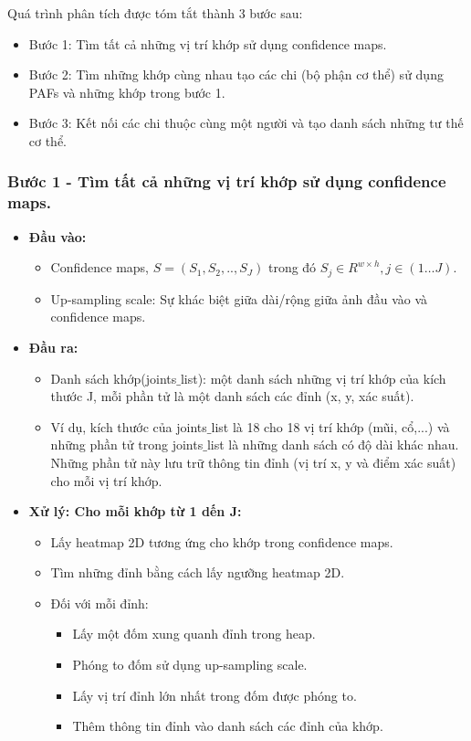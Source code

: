 Quá trình phân tích được tóm tắt thành 3 bước sau:
\begin{itemize}
\item Bước 1: Tìm tất cả những vị trí khớp sử dụng confidence maps.
\item Bước 2: Tìm những khớp cùng nhau tạo các chi (bộ phận cơ thể) sử dụng PAFs và những khớp trong bước 1.
\item Bước 3: Kết nối các chi thuộc cùng một người và tạo danh sách những tư thế cơ thể.
\end{itemize}

\subsubsection{Bước 1 - Tìm tất cả những vị trí khớp sử dụng confidence maps.}
\begin{itemize}
\item \textbf{Đầu vào:}
	\begin{itemize}
	\item Confidence maps, $S = (S_1, S_2, .., S_J)$ trong đó $S_j \in R^{w \times h},j \in (1 \ldots J)$.
	\item Up-sampling scale: Sự khác biệt giữa dài/rộng giữa ảnh đầu vào và confidence maps.
	\end{itemize}
\item \textbf{Đầu ra: }
	\begin{itemize}
	\item Danh sách khớp(joints$\_$list): một danh sách những vị trí khớp của kích thước J, mỗi phần tử là một danh sách các đỉnh (x, y, xác suất).
	\item Ví dụ, kích thước của joints$\_$list là 18 cho 18 vị trí khớp (mũi, cổ,...) và những phần tử trong joints$\_$list là những danh sách có độ dài khác nhau. Những phần tử này lưu trữ thông tin đỉnh (vị trí x, y và điểm xác suất) cho mỗi vị trí khớp.
	\end{itemize}
\item \textbf{Xử lý: Cho mỗi khớp từ 1 dến J:}
	\begin{itemize}
	\item Lấy heatmap 2D tương ứng cho khớp trong confidence maps.
	\item Tìm những đỉnh bằng cách lấy ngưỡng heatmap 2D.
	\item Đối với mỗi đỉnh:
		\begin{itemize}
		\item Lấy một đốm xung quanh đỉnh trong heap.
		\item Phóng to đốm sử dụng up-sampling scale.
		\item Lấy vị trí đỉnh lớn nhất trong đốm được phóng to.
		\item Thêm thông tin đỉnh vào danh sách các đỉnh của khớp.
		\end{itemize}
	\end{itemize}
\end{itemize}

